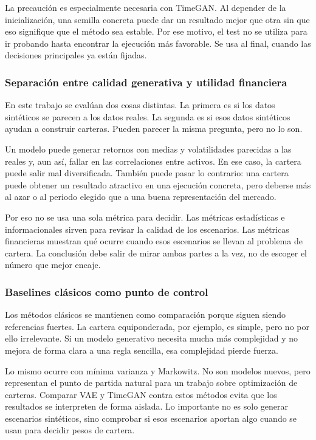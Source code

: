 \documentclass[11pt,a4paper,spanish,oneside]{book}
\numberwithin{equation}{chapter}
\numberwithin{figure}{chapter}
\begin{document}
La precaución es especialmente necesaria con TimeGAN. Al depender de la inicialización, una semilla concreta puede dar un resultado mejor que otra sin que eso signifique que el método sea estable. Por ese motivo, el test no se utiliza para ir probando hasta encontrar la ejecución más favorable. Se usa al final, cuando las decisiones principales ya están fijadas.

\subsubsection{Separación entre calidad generativa y utilidad financiera}

En este trabajo se evalúan dos cosas distintas. La primera es si los datos sintéticos se parecen a los datos reales. La segunda es si esos datos sintéticos ayudan a construir carteras. Pueden parecer la misma pregunta, pero no lo son.

Un modelo puede generar retornos con medias y volatilidades parecidas a las reales y, aun así, fallar en las correlaciones entre activos. En ese caso, la cartera puede salir mal diversificada. También puede pasar lo contrario: una cartera puede obtener un resultado atractivo en una ejecución concreta, pero deberse más al azar o al periodo elegido que a una buena representación del mercado.

Por eso no se usa una sola métrica para decidir. Las métricas estadísticas e informacionales sirven para revisar la calidad de los escenarios. Las métricas financieras muestran qué ocurre cuando esos escenarios se llevan al problema de cartera. La conclusión debe salir de mirar ambas partes a la vez, no de escoger el número que mejor encaje.

\subsubsection{Baselines clásicos como punto de control}

Los métodos clásicos se mantienen como comparación porque siguen siendo referencias fuertes. La cartera equiponderada, por ejemplo, es simple, pero no por ello irrelevante. Si un modelo generativo necesita mucha más complejidad y no mejora de forma clara a una regla sencilla, esa complejidad pierde fuerza.

Lo mismo ocurre con mínima varianza y Markowitz. No son modelos nuevos, pero representan el punto de partida natural para un trabajo sobre optimización de carteras. Comparar VAE y TimeGAN contra estos métodos evita que los resultados se interpreten de forma aislada. Lo importante no es solo generar escenarios sintéticos, sino comprobar si esos escenarios aportan algo cuando se usan para decidir pesos de cartera.
\end{document}
